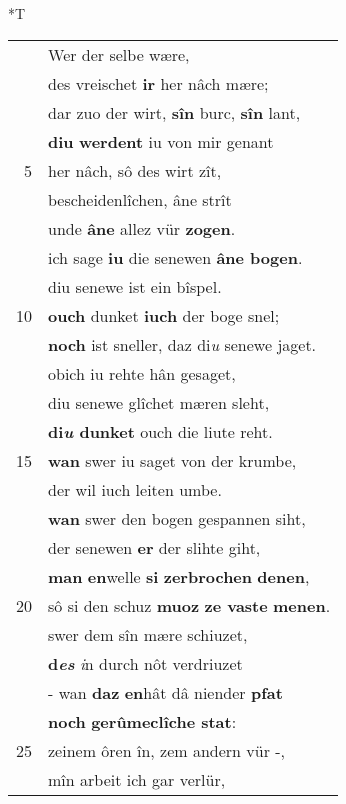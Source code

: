 \documentclass[8pt,a4paper,notitlepage]{article}
\begin{document}
\begin{table}[ht]
\begin{minipage}[t]{0.5\linewidth}
\end{minipage}
\hspace{0.5cm}
\begin{minipage}[t]{0.5\linewidth}
\small
\begin{center}*T
\end{center}
\begin{tabular}{rl}
 & Wer der selbe wære,\\ 
 & des vreischet \textbf{ir} her nâch mære;\\ 
 & dar zuo der wirt, \textbf{sîn} burc, \textbf{sîn} lant,\\ 
 & \textbf{diu} \textbf{werdent} iu von mir genant\\ 
5 & her nâch, sô des wirt zît,\\ 
 & bescheidenlîchen, âne strît\\ 
 & unde \textbf{âne} allez vür \textbf{zogen}.\\ 
 & ich sage \textbf{iu} die senewen \textbf{âne bogen}.\\ 
 & diu senewe ist ein bîspel.\\ 
10 & \textbf{ouch} dunket \textbf{iuch} der boge snel;\\ 
 & \textbf{noch} ist sneller, daz di\textit{u} senewe jaget.\\ 
 & obich iu rehte hân gesaget,\\ 
 & diu senewe glîchet mæren sleht,\\ 
 & \textbf{di\textit{u} dunket} ouch die liute reht.\\ 
15 & \textbf{wan} swer iu saget von der krumbe,\\ 
 & der wil iuch leiten umbe.\\ 
 & \textbf{wan} swer den bogen gespannen siht,\\ 
 & der senewen \textbf{er} der slihte giht,\\ 
 & \textbf{man} \textbf{en}welle \textbf{si} \textbf{zerbrochen} \textbf{denen},\\ 
20 & sô si den schuz \textbf{muoz} \textbf{ze vaste} \textbf{menen}.\\ 
 & swer dem sîn mære schiuzet,\\ 
 & \textbf{d\textit{es}} \textit{i}n durch nôt verdriuzet\\ 
 & - wan \textbf{daz} \textbf{en}hât dâ niender \textbf{pfat}\\ 
 & \textbf{noch} \textbf{gerûmeclîche stat}:\\ 
25 & zeinem ôren în, zem andern vür -,\\ 
 & mîn arbeit ich gar verlür,\\ 

\end{tabular}
\end{minipage}
\end{table}
\end{document}
